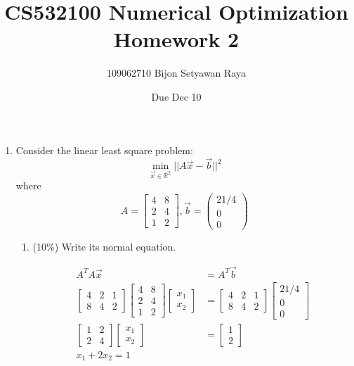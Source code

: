 \documentclass[a4paper,10pt]{article}
\title{CS532100 Numerical Optimization Homework 2}
\author{109062710 Bijon Setyawan Raya}
\date{Due Dec 10}
\begin{document}
\maketitle
\begin{enumerate}
    \item Consider the linear least square problem:
    \[ 
        \min_{\vec{x}\in \mathbb{R}^2}||A\vec{x} - \vec{b}||^2
    \]
    where
    \[
        A = \left[ \begin{array}{cc}4 & 8 \\ 2 & 4 \\ 1 & 2 \end{array} \right], 
        \vec{b} = \left(\begin{array}{c} 21/4 \\ 0 \\ 0 \end{array} \right)
    \]

\begin{enumerate}
	\item (10\%) Write its normal equation.
    {\color{blue} 
        \begin{align}
            A^T A \vec{x} &= A^T \vec{b} \\
            \begin{bmatrix}4 & 2 & 1 \\ 8 & 4 & 2\end{bmatrix} \begin{bmatrix}4 & 8 \\ 2 & 4 \\ 1 & 2\end{bmatrix} \begin{bmatrix} x_1 \\ x_2 \end{bmatrix} &= \begin{bmatrix}4 & 2 & 1 \\ 8 & 4 & 2\end{bmatrix} \begin{bmatrix}21/4 \\ 0 \\ 0\end{bmatrix} \\
            \begin{bmatrix} 1 & 2 \\ 2 & 4 \end{bmatrix} \begin{bmatrix} x_1 \\ x_2 \end{bmatrix} &= \begin{bmatrix} 1 \\ 2 \end{bmatrix} \\
            x_1 + 2x_2 = 1
        \end{align}

}
\end{enumerate}
\end{enumerate}
\end{document}
